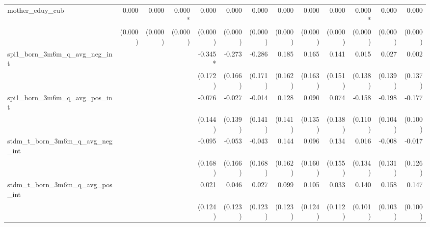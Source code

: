 \begin{tabular}{lrrrrrrrrrrrr}
mother\_eduy\_cub                           &        0.000 &        0.000 &       0.000* &        0.000 &        0.000 &        0.000 &        0.000 &        0.000 &        0.000 &       0.000* &        0.000 &        0.000 \\ 
                                            &      (0.000) &      (0.000) &      (0.000) &      (0.000) &      (0.000) &      (0.000) &      (0.000) &      (0.000) &      (0.000) &      (0.000) &      (0.000) &      (0.000) \\ 
spi1\_born\_3m6m\_q\_avg\_neg\_int          &              &              &              &      -0.345* &       -0.273 &       -0.286 &        0.185 &        0.165 &        0.141 &        0.015 &        0.027 &        0.002 \\ 
                                            &              &              &              &      (0.172) &      (0.166) &      (0.171) &      (0.162) &      (0.163) &      (0.151) &      (0.138) &      (0.139) &      (0.137) \\ 
spi1\_born\_3m6m\_q\_avg\_pos\_int          &              &              &              &       -0.076 &       -0.027 &       -0.014 &        0.128 &        0.090 &        0.074 &       -0.158 &       -0.198 &       -0.177 \\ 
                                            &              &              &              &      (0.144) &      (0.139) &      (0.141) &      (0.141) &      (0.135) &      (0.138) &      (0.110) &      (0.104) &      (0.100) \\ 
stdm\_t\_born\_3m6m\_q\_avg\_neg\_int       &              &              &              &       -0.095 &       -0.053 &       -0.043 &        0.144 &        0.096 &        0.134 &        0.016 &       -0.008 &       -0.017 \\ 
                                            &              &              &              &      (0.168) &      (0.166) &      (0.168) &      (0.162) &      (0.160) &      (0.155) &      (0.134) &      (0.131) &      (0.126) \\ 
stdm\_t\_born\_3m6m\_q\_avg\_pos\_int       &              &              &              &        0.021 &        0.046 &        0.027 &        0.099 &        0.105 &        0.033 &        0.140 &        0.158 &        0.147 \\ 
                                            &              &              &              &      (0.124) &      (0.123) &      (0.123) &      (0.123) &      (0.124) &      (0.112) &      (0.101) &      (0.103) &      (0.100) \\ 

\end{tabular}
